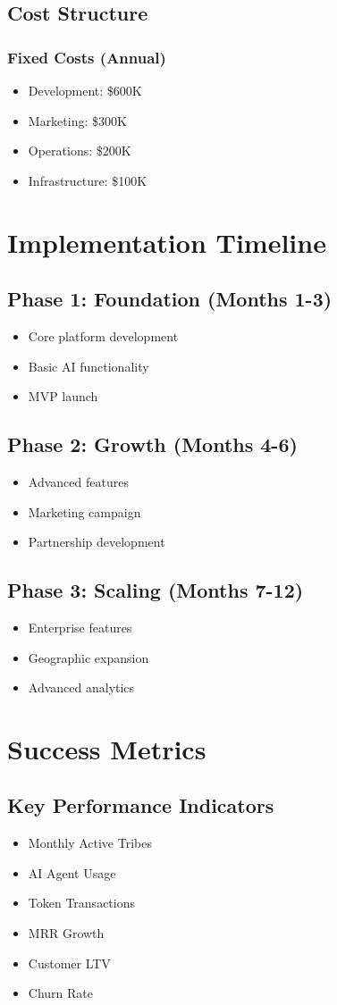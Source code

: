 \documentclass[11pt]{article}
\begin{document}
\subsection{Cost Structure}
\subsubsection{Fixed Costs (Annual)}
\begin{itemize}
    \item Development: \$600K
    \item Marketing: \$300K
    \item Operations: \$200K
    \item Infrastructure: \$100K
\end{itemize}

\section{Implementation Timeline}

\subsection{Phase 1: Foundation (Months 1-3)}
\begin{itemize}
    \item Core platform development
    \item Basic AI functionality
    \item MVP launch
\end{itemize}

\subsection{Phase 2: Growth (Months 4-6)}
\begin{itemize}
    \item Advanced features
    \item Marketing campaign
    \item Partnership development
\end{itemize}

\subsection{Phase 3: Scaling (Months 7-12)}
\begin{itemize}
    \item Enterprise features
    \item Geographic expansion
    \item Advanced analytics
\end{itemize}

\section{Success Metrics}

\subsection{Key Performance Indicators}
\begin{itemize}
    \item Monthly Active Tribes
    \item AI Agent Usage
    \item Token Transactions
    \item MRR Growth
    \item Customer LTV
    \item Churn Rate
\end{itemize}
\end{document}
